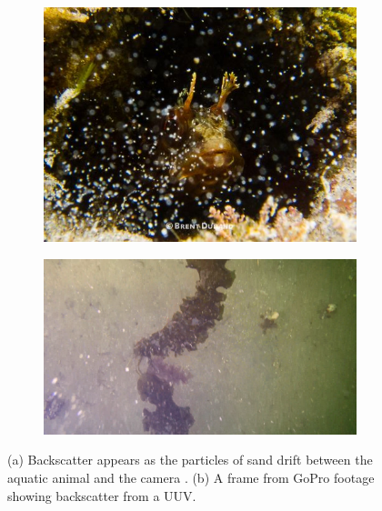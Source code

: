 \begin{figure}[H]
    \centering
    \begin{subfigure}{.495\textwidth}
        \centering
        \includegraphics[width=1\linewidth]{assets/backscatter_article_durand2.jpg}
        \caption{}
    \end{subfigure}
    \hfill
    \begin{subfigure}{.495\textwidth}
        \centering
        \includegraphics[width=1\linewidth]{assets/backscatter_test_vid.png}
        \caption{}
    \end{subfigure}
    \caption{(a) Backscatter appears as the particles of sand drift between the aquatic animal and the camera \cite{brentdurandEasyWaysEliminate2013}. (b) A frame from GoPro footage showing backscatter from a UUV.}
    \label{fig:backscatter}
\end{figure}

